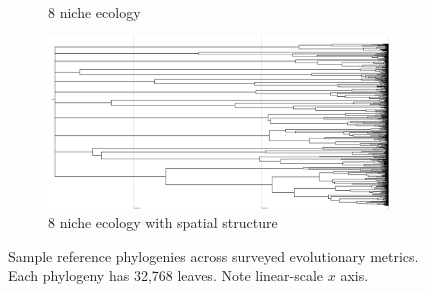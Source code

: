 \begin{figure}
\begin{subfigure}[b]{0.5\columnwidth}
    \caption{%
      8 niche ecology}
  \end{subfigure}
  \hfill
  \begin{subfigure}[b]{0.5\columnwidth}
    \includegraphics[height=0.12\textheight,width=\textwidth]{img/perfect-tree-phylogenies-log/epoch=7+resolution=3+treatment=18/a=collapsed-phylogeny+epoch=00007+mut_distn=np.random.standard_normal+num_generations=32768+num_islands=1024+num_niches=8+p_island_migration=0.01+p_niche_invasion=3.0517578125e-08+population_size=3276.../8+replicate=0+tournament_size=2+treatment=18+_generation=262144+_index=18+scale=nonlog+ext=.pdf}
    \caption{%
      8 niche ecology with spatial structure}
  \end{subfigure}
  \hfill
  \caption{%
    Sample reference phylogenies across surveyed evolutionary metrics.
    Each phylogeny has 32,768 leaves.
    Note linear-scale $x$ axis.
  }
  \label{fig:perfect-tree-phylogenies-nonlog}
\end{figure}


